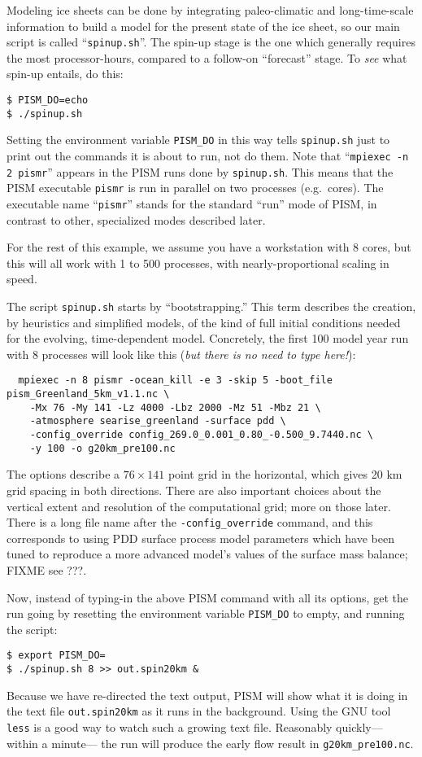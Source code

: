 Modeling ice sheets can be done by integrating paleo-climatic and long-time-scale information to build a model for the present state of the ice sheet, so our main script is called ``\texttt{spinup.sh}''.  The spin-up stage is the one which generally requires the most processor-hours, compared to a follow-on ``forecast'' stage.  To \emph{see} what spin-up entails, do this:
\begin{verbatim}
$ PISM_DO=echo
$ ./spinup.sh
\end{verbatim}
Setting the environment variable \texttt{PISM_DO} in this way tells \texttt{spinup.sh} just to print out the commands it is about to run, not do them.  Note that ``\texttt{mpiexec -n 2 pismr}'' appears in the PISM runs done by \texttt{spinup.sh}.  This means that the PISM executable \texttt{pismr} is run in parallel on two processes (e.g.~cores).  The executable name ``\texttt{pismr}'' stands for the standard ``run'' mode of PISM, in contrast to other, specialized modes described later.

For the rest of this example, we assume you have a workstation with 8 cores, but this will all work with 1 to 500 processes, with nearly-proportional scaling in speed.

The script \texttt{spinup.sh} starts by ``bootstrapping.''  This term describes the creation, by heuristics and simplified models, of the kind of full initial conditions needed for the evolving, time-dependent model.  Concretely, the first 100 model year run with 8 processes will look like this (\emph{but there is no need to type here!}):
\small
\begin{verbatim}
  mpiexec -n 8 pismr -ocean_kill -e 3 -skip 5 -boot_file pism_Greenland_5km_v1.1.nc \
    -Mx 76 -My 141 -Lz 4000 -Lbz 2000 -Mz 51 -Mbz 21 \
    -atmosphere searise_greenland -surface pdd \
    -config_override config_269.0_0.001_0.80_-0.500_9.7440.nc \
    -y 100 -o g20km_pre100.nc
\end{verbatim}
\normalsize
The options describe a $76\times 141$ point grid in the horizontal, which gives 20 km grid spacing in both directions.  There are also important choices about the vertical extent and resolution of the computational grid; more on those later.  There is a long file name after the \verb|-config_override| command, and this corresponds to using PDD surface process model parameters which have been tuned to reproduce a more advanced model's values of the surface mass balance; FIXME see ???.

Now, instead of typing-in the above PISM command with all its options, get the run going by resetting the environment variable \texttt{PISM_DO} to empty, and running the script:
\begin{verbatim}
$ export PISM_DO=
$ ./spinup.sh 8 >> out.spin20km &
\end{verbatim}
\noindent Because we have re-directed the text output, PISM will show what it is doing in the text file \texttt{out.spin20km} as it runs in the background.  Using the GNU tool \texttt{less} is a good way to watch such a growing text file.  Reasonably quickly--- within a minute--- the run will produce the early flow result in \texttt{g20km_pre100.nc}.

